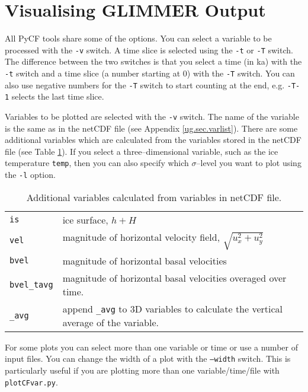 \section{Visualising GLIMMER Output}
All PyCF tools share some of the options. You can select a variable to be processed with the \texttt{-v} switch. A time slice is selected using the \texttt{-t} or \texttt{-T} switch. The difference between the two switches is that you select a time (in ka) with the \texttt{-t} switch and a time slice (a number starting at 0) with the \texttt{-T} switch. You can also use negative numbers for the \texttt{-T} switch to start counting at the end, e.g. \texttt{-T-1} selects the last time slice.

Variables to be plotted are selected with the \texttt{-v} switch. The name of the variable is the same as in the netCDF file (see Appendix \ref{ug.sec.varlist}). There are some additional variables which are calculated from the variables stored in the netCDF file (see Table \ref{tg.tab.extra_vars}). If you select a three--dimensional variable, such as the ice temperature \texttt{temp}, then you can also specify which $\sigma$--level you want to plot using the \texttt{-l} option.

\begin{table}[htbp]
  \centering
  \begin{tabular}{|p{}|p{}|}
    \hline
    \texttt{is} & ice surface, $h+H$ \\
    \texttt{vel} & magnitude of horizontal velocity field, $\sqrt{u_x^2+u_y^2}$ \\
    \texttt{bvel} & magnitude of horizontal basal velocities \\
    \texttt{bvel\_tavg} & magnitude of horizontal basal velocities overaged over time.\\
    \texttt{\_avg} & append \texttt{\_avg} to 3D variables to calculate the vertical average of the variable.\\
    \hline
  \end{tabular}
  \caption{Additional variables calculated from variables in netCDF file.}
  \label{tg.tab.extra_vars}
\end{table}

For some plots you can select more than one variable or time or use a number of input files. You can change the width of a plot with the \texttt{--width} switch. This is particularly useful if you are plotting more than one variable/time/file with \texttt{plotCFvar.py}.

